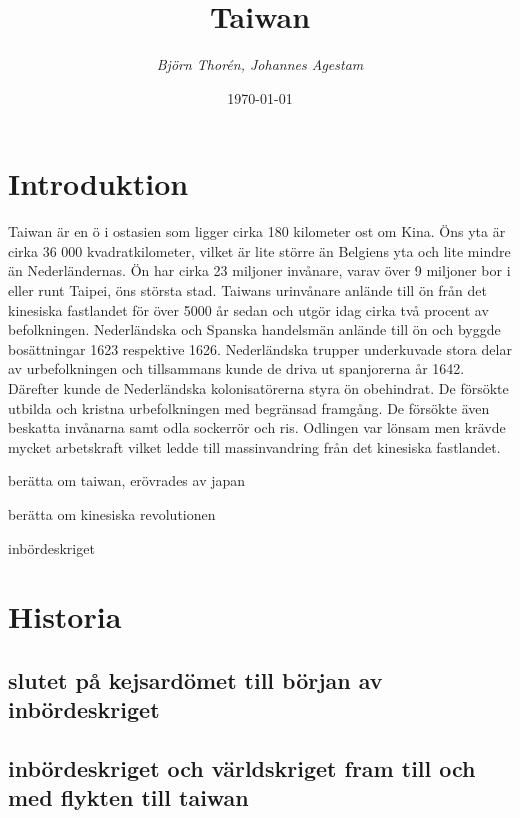 \documentclass[a4paper,10pt]{article}
\title{\Huge\bf{Taiwan}\\}
\author{\emph{Björn Thorén, Johannes Agestam}}
\date{\today}
\begin{document}
\maketitle


\section*{Introduktion}

Taiwan är en ö i ostasien som ligger cirka 180 kilometer ost om Kina. Öns yta är cirka 36 000 kvadratkilometer, vilket är lite större än Belgiens yta och lite mindre än Nederländernas. Ön har cirka 23 miljoner invånare, varav över 9 miljoner bor i eller runt Taipei, öns största stad. Taiwans urinvånare anlände till ön från det kinesiska fastlandet för över 5000 år sedan och utgör idag cirka två procent av befolkningen. Nederländska och Spanska handelsmän anlände till ön och byggde bosättningar 1623 respektive 1626. Nederländska trupper underkuvade stora delar av urbefolkningen och tillsammans kunde de driva ut spanjorerna år 1642. Därefter kunde de Nederländska kolonisatörerna styra ön obehindrat. De försökte utbilda och kristna urbefolkningen med begränsad framgång. De försökte även beskatta invånarna samt odla sockerrör och ris. Odlingen var lönsam men krävde mycket arbetskraft vilket ledde till massinvandring från det kinesiska fastlandet.


berätta om taiwan, erövrades av japan

berätta om kinesiska revolutionen

inbördeskriget

\section*{Historia}

\subsection*{slutet på kejsardömet till början av inbördeskriget}

\subsection*{inbördeskriget och världskriget fram till och med flykten till taiwan}
\end{document}
